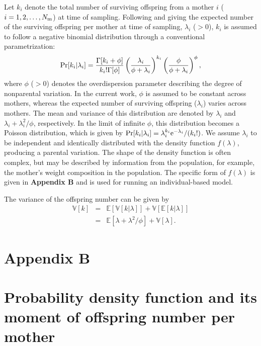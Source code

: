\documentclass[12pt, English]{article}
\begin{document}
\begin{spacing}{1.9}
Let $k_i$ denote the total number of surviving offspring from a mother  $i$ ($i= 1, 2, \dots, N_{\rm m}$) at time of sampling. Following \cite{Akita_2019} and giving the expected number of the surviving offspring per mother at time of sampling, $\lambda_i$ ($>0$), $k_i$ is assumed to follow a negative binomial distribution through a conventional parametrization:
\begin{equation}
{\rm Pr}[ k_i | \lambda_i ] = \frac{\Gamma[k_i+\phi]}{k_i! \Gamma[\phi]} \left( \frac{\lambda_i}{\phi+\lambda_i} \right)^{k_i} \left( \frac{\phi}{\phi+\lambda_i} \right)^{\phi}, 
\label{NB}
\end{equation}
where $\phi$ ($>0$) denotes the overdispersion parameter describing the degree of nonparental variation. In the current work, $\phi$ is assumed to be constant across mothers, whereas the expected number of surviving offspring ($\lambda_i$) varies across mothers. The mean and variance of this distribution are denoted by $\lambda_i$ and $\lambda_i + \lambda_i^2/\phi$, respectively. In the limit of infinite $\phi$, this distribution becomes a Poisson distribution, which is given by ${\rm Pr}[ k_i | \lambda_i ]=\lambda_i^{k_i} \mathrm{e}^{-\lambda_i}/(k_i!)$. We assume $\lambda_i$ to be independent and identically distributed with the density function $f(\lambda)$, producing a parental variation. The shape of the density function is often complex, but may be described by information from the population, for example, the mother's weight composition in the population. The specific form of $f(\lambda)$ is given in {\bf Appendix B} and is used for running an individual-based model.  

The variance of the offspring number can be given by 
\begin{eqnarray}
\mathbb{V}[k] &=& \mathbb{E}[ \mathbb{V}[k|\lambda] ] + \mathbb{V}[ \mathbb{E}[k|\lambda] ] \nonumber\\
&=& \mathbb{E}[ \lambda + \lambda^2 / \phi ] + \mathbb{V}[ \lambda ].
\label{V_k}
\end{eqnarray}

\section*{Appendix B}
\setcounter{equation}{0}
\section*{Probability density function and its moment of offspring number per mother}
\renewcommand{\theequation}{B\arabic{equation}}


\end{spacing}
\end{document}
